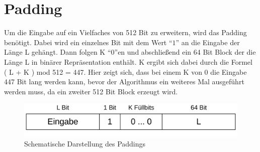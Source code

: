 \section{Padding}
\label{sec:sha256:padding}

Um die Eingabe auf ein Vielfaches von 512 Bit zu erweitern, wird das Padding benötigt. Dabei wird ein einzelnes Bit mit dem Wert "`$1$"' an die Eingabe der Länge L gehängt.
Dann folgen K "`$0$"'en und abschließend ein 64 Bit Block der die Länge L in binärer Repräsentation enthält. K ergibt sich dabei durch die Formel ( L + K ) mod 512 = 447.
Hier zeigt sich, dass bei einem K von 0 die Eingabe 447 Bit lang werden kann, bevor der Algorithmus ein weiteres Mal ausgeführt werden muss, da ein zweiter 512 Bit Block
erzeugt wird.

\begin{figure}[!h]
  \centering
  \includegraphics[scale=0.4]{images/sha256padding}
  \caption{Schematische Darstellung des Paddings}
  \label{fig:sha256padding}
\end{figure}